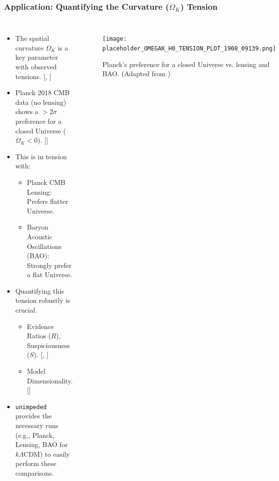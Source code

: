 \documentclass[aspectratio=169]{beamer}
\begin{document}
\begin{frame}
    \frametitle{Application: Quantifying the Curvature ($\Omega_K$) Tension}
    \begin{columns}[T]
        \begin{itemize}
            \item The spatial curvature $\Omega_K$ is a key parameter with observed tensions. [, ]
            \item Planck 2018 CMB data (no lensing) shows a $>2\sigma$ preference for a closed Universe ($\Omega_K < 0$). []
            \item This is in tension with:
                \begin{itemize}
                    \item Planck CMB Lensing: Prefers flatter Universe.
                    \item Baryon Acoustic Oscillations (BAO): Strongly prefer a flat Universe.
                \end{itemize}
            \item Quantifying this tension robustly is crucial.
                \begin{itemize}
                    \item Evidence Ratios ($R$), Suspiciousness ($S$). [, ]
                    \item Model Dimensionality. []
                \end{itemize}
            \item \texttt{unimpeded} provides the necessary runs (e.g., Planck, Lensing, BAO for $k\Lambda$CDM) to easily perform these comparisons.
        \end{itemize}
        \begin{figure}
            \centering
            \texttt{[image: placeholder\_OMEGAK\_H0\_TENSION\_PLOT\_1908\_09139.png]}
            \caption{Planck's preference for a closed Universe vs. lensing and BAO. (Adapted from )}
        \end{figure}
    \end{columns}
\end{frame}
\end{document}
